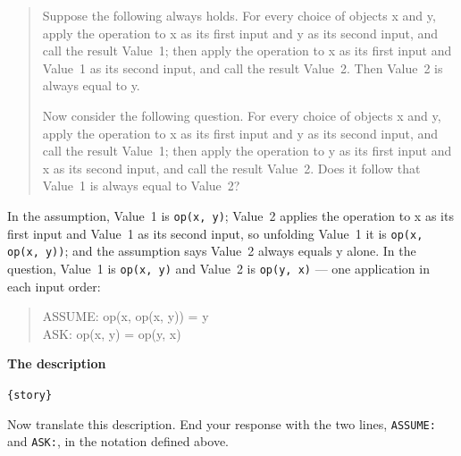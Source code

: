 \documentclass{article}
\begin{document}
\begin{promptbox}
\begin{quote}
\medskip
Suppose the following always holds. For every choice of objects x and y,
apply the operation to x as its first input and y as its second input,
and call the result Value~1; then apply the operation to x as its first
input and Value~1 as its second input, and call the result Value~2. Then
Value~2 is always equal to y.

\medskip
Now consider the following question. For every choice of objects x and y,
apply the operation to x as its first input and y as its second input,
and call the result Value~1; then apply the operation to y as its first
input and x as its second input, and call the result Value~2. Does it
follow that Value~1 is always equal to Value~2?
\end{quote}

In the assumption, Value~1 is \texttt{op(x, y)}; Value~2 applies the
operation to x as its first input and Value~1 as its second input, so
unfolding Value~1 it is \texttt{op(x, op(x, y))}; and the assumption says
Value~2 always equals y alone. In the question, Value~1 is
\texttt{op(x, y)} and Value~2 is \texttt{op(y, x)} --- one application in
each input order:
\begin{quote}\ttfamily
ASSUME: op(x, op(x, y)) = y\\
ASK: op(x, y) = op(y, x)
\end{quote}

\vspace{0.4em}
\noindent\textbf{The description}

\texttt{\{story\}}

\medskip
Now translate this description. End your response with the two lines,
\texttt{ASSUME:} and \texttt{ASK:}, in the notation defined above.

\end{promptbox}
\end{document}
